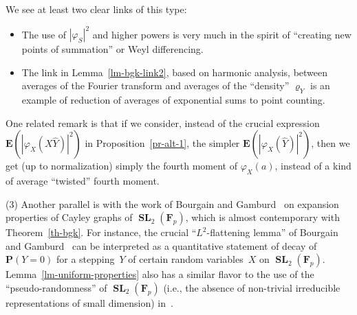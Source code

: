 \documentclass[12pt]{amsart}
\numberwithin{equation}{section}
\newcommand{\Ff}{\mathbf{F}}
\newcommand{\proba}{\mathbf{P}}
\newcommand{\expect}{\mathbf{E}}
\renewcommand{\rho}{\varrho}
\DeclareMathOperator{\SL}{\mathbf{SL}}
\theoremstyle{plain}
\theoremstyle{remark}
\theoremstyle{definition}
\begin{document}
We see at least two clear links of this type:
\begin{itemize}
\item The use of $|\varphi_S|^2$ and higher powers is very much in the
  spirit of ``creating new points of summation'' or Weyl differencing.
\item The link in Lemma~\ref{lm-bgk-link2}, based on harmonic analysis,
  between averages of the Fourier transform and averages of the
  ``density'' $\rho_Y$ is an example of reduction of averages of
  exponential sums to point counting.
\end{itemize}

One related remark is that if we consider, instead of the crucial
expression $\expect(|\varphi_X(X\widehat{Y})|^2)$ in
Proposition~\ref{pr-alt-1}, the simpler
$\expect(|\varphi_X(\widehat{Y})|^2)$, then we get (up to normalization)
simply the fourth moment of $\varphi_X(a)$, instead of a kind of average
``twisted'' fourth moment.


\par
(3) Another parallel is with the work of Bourgain and
Gamburd~\cite{bourgain-gamburd} on expansion properties of Cayley graphs
of $\SL_2(\Ff_p)$, which is almost contemporary with
Theorem~\ref{th-bgk}. For instance, the crucial ``$L^2$-flattening
lemma'' of Bourgain and Gamburd~\cite[Prop.\,2]{bourgain-gamburd} can be
interpreted as a quantitative statement of decay of $\proba(Y=0)$ for a
stepping~$Y$ of certain random variables~$X$ on $\SL_2(\Ff_p)$.
Lemma~\ref{lm-uniform-properties} also has a similar flavor to the use
of the ``pseudo-randomness'' of $\SL_2(\Ff_p)$ (i.e., the absence of
non-trivial irreducible representations of small dimension)
in~\cite[Prop.\,1]{bourgain-gamburd}.
\end{document}
